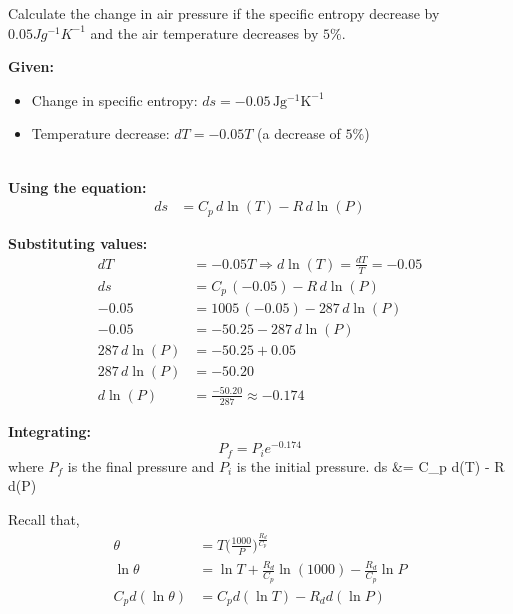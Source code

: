 \documentclass[fleqn,10pt]{SelfArx} %
\begin{document}
\begin{question}[\label=17.1]{Calculate the change in air pressure if the specific entropy decrease by $0.05 Jg^{-1}K^{-1}$ and the air temperature decreases by $5\%$.}
\Rightarrow  {}


    \textbf{Given:}
    \begin{itemize}[noitemsep]
        \item Change in specific entropy: \( ds = -0.05 \, \mathrm{Jg^{-1}K^{-1}} \)
        \item Temperature decrease: \( dT = -0.05T \) (a decrease of \( 5\% \))
    \end{itemize}
 \\
    \textbf{Using the equation:}
    \begin{align*}
        ds &= C_p \, d\ln(T) - R \, d\ln(P)
    \end{align*}

    \textbf{Substituting values:}
    \begin{align*}
        dT &= -0.05T \Rightarrow d\ln(T) = \frac{dT}{T} = -0.05 \\
        ds &= C_p \, (-0.05) - R \, d\ln(P) \\
        -0.05 &= 1005 \, (-0.05) - 287 \, d\ln(P) \\
        -0.05 &= -50.25 - 287 \, d\ln(P) \\
        287 \, d\ln(P) &= -50.25 + 0.05 \\
        287 \, d\ln(P) &= -50.20 \\
        d\ln(P) &= \frac{-50.20}{287} \approx -0.174
    \end{align*}

    \textbf{Integrating:}
    \[
    P_f = P_i e^{-0.174}
    \]
    where \( P_f \) is the final pressure and \( P_i \) is the initial pressure.   ds &= C_p d\ln(T) - R d\ln(P)
\end{question}

Recall that,
\begin{align}
    \theta &= T\Big(\frac{1000}{P}\Big)^{\frac{R_d}{C_p}} \\
    \ln \theta &= \ln T + \frac{R_d}{C_p}\ln(1000) - \frac{R_d}{C_p}\ln P \\ 
    C_p d(\ln \theta) &= C_p d(\ln T) - R_d d(\ln P) \label{eq:2ndLaw1}
\end{align}
\end{document}
